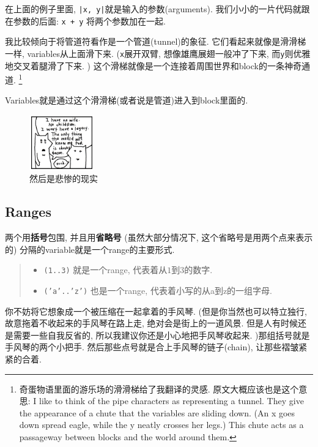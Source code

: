 在上面的例子里面, \texttt{|x, y|}就是输入的参数(arguments).
我们小小的一片代码就跟在参数的后面: \texttt{x + y}
将两个参数加在一起. 

我比较倾向于将管道符看作是一个管道(tunnel)的象征. 
它们看起来就像是滑滑梯一样, variables从上面滑下来. 
(\texttt{x}展开双臂, 想像雄鹰展翅一般冲了下来, 而\texttt{y}则优雅地交叉着腿滑了下来. )
这个滑梯就像是一个连接着周围世界和block的一条神奇通道. 
\footnote{奇蛋物语里面的游乐场的滑滑梯给了我翻译的灵感. 原文大概应该也是这个意思: I like to think of the pipe characters as representing a tunnel. They give the appearance of a chute that the variables are sliding down. (An x goes down spread eagle, while the y neatly crosses her legs.) This chute acts as a passageway between blocks and the world around them.}

Variables就是通过这个滑滑梯(或者说是管道)进入到block里面的. 

\begin{figure}
  \centering
  \includegraphics[width=0.25\textwidth]{image/why/foxes-4g.png}
  \caption{然后是悲惨的现实}
\end{figure}

\subsection*{Ranges}
两个用\textbf{括号}包围, 并且用\textbf{省略号}
(虽然大部分情况下, 这个省略号是用两个点来表示的)
分隔的variable就是一个range的主要形式. 

\begin{quotation}
  \begin{itemize}
    \item \texttt{(1..3)} 就是一个range, 代表着从$1$到$3$的数字. 
    \item \texttt{('a'..'z')} 也是一个range, 代表着小写的从a到z的一组字母. 
  \end{itemize}
\end{quotation}

你不妨将它想象成一个被压缩在一起拿着的手风琴. 
(但是你当然也可以特立独行, 故意拖着不收起来的手风琴在路上走, 
绝对会是街上的一道风景. 但是人有时候还是需要一些自我反省的, 
所以我建议你还是小心地把手风琴收起来. )那组括号就是手风琴的两个小把手.
然后那些点号就是合上手风琴的链子(chain), 让那些褶皱紧紧的合着. 

